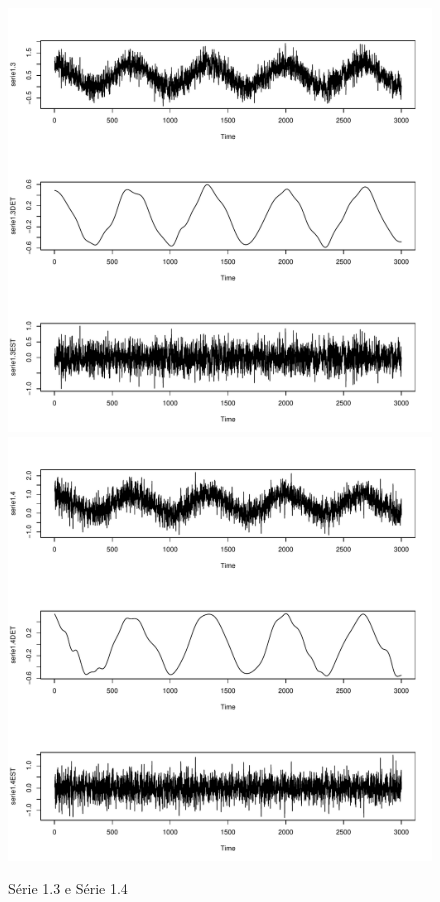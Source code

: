 \graphicspath{{imagens/}}
\begin{figure}[H]
\begin{center}
  \includegraphics[scale=0.43]{serie1_3.pdf} \quad
  \includegraphics[scale=0.43]{serie1_4.pdf}
  \caption{Série 1.3 e Série 1.4}

\end{center}
\end{figure}


